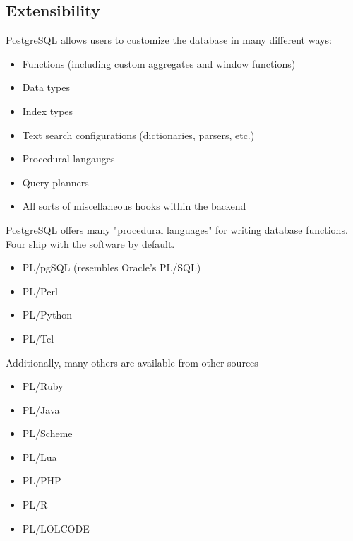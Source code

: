 \documentclass[svgnames]{beamer}
\begin{document}
\subsection{Extensibility}
\begin{frame}
PostgreSQL allows users to customize the database in many different ways:
\begin{itemize}
    \item Functions (including custom aggregates and window functions)
    \item Data types
    \item Index types
    \item Text search configurations (dictionaries, parsers, etc.)
    \item Procedural langauges
    \item Query planners
    \item All sorts of miscellaneous hooks within the backend
\end{itemize}
\end{frame}

\begin{frame}
PostgreSQL offers many "procedural languages" for writing database functions. Four ship with the software by default.
\begin{itemize}
    \item PL/pgSQL (resembles Oracle's PL/SQL)
    \item PL/Perl
    \item PL/Python
    \item PL/Tcl
\end{itemize}
Additionally, many others are available from other sources
\begin{itemize}
    \item PL/Ruby
    \item PL/Java
    \item PL/Scheme
    \item PL/Lua
    \item PL/PHP
    \item PL/R
    \item PL/LOLCODE
\end{itemize}
\end{frame}
\end{document}
